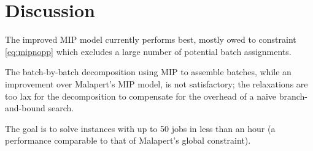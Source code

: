 \chapter{Discussion}\label{sec:discussion}
The improved MIP model currently performs best, mostly owed to constraint
\eqref{eq:mipnopp} which excludes a large number of potential batch assignments.

The batch-by-batch decomposition using MIP to assemble batches, while an
improvement over Malapert's MIP model, is not satisfactory; the relaxations are
too lax for the decomposition to compensate for the overhead of a naive
branch-and-bound search.

The goal is to solve instances with up to 50 jobs in less than an hour (a
performance comparable to that of Malapert's global constraint).
